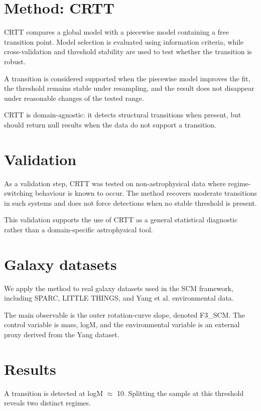 \documentclass[fleqn,usenatbib]{mnras}
\begin{document}
\section{Method: CRTT}

CRTT compares a global model with a piecewise model containing a free transition point. Model selection is evaluated using information criteria, while cross-validation and threshold stability are used to test whether the transition is robust.

A transition is considered supported when the piecewise model improves the fit, the threshold remains stable under resampling, and the result does not disappear under reasonable changes of the tested range.

CRTT is domain-agnostic: it detects structural transitions when present, but should return null results when the data do not support a transition.

\section{Validation}

As a validation step, CRTT was tested on non-astrophysical data where regime-switching behaviour is known to occur. The method recovers moderate transitions in such systems and does not force detections when no stable threshold is present.

This validation supports the use of CRTT as a general statistical diagnostic rather than a domain-specific astrophysical tool.

\section{Galaxy datasets}

We apply the method to real galaxy datasets used in the SCM framework, including SPARC, LITTLE THINGS, and Yang et al. environmental data.

The main observable is the outer rotation-curve slope, denoted F3\_SCM. The control variable is mass, logM, and the environmental variable is an external proxy derived from the Yang dataset.

\section{Results}

A transition is detected at logM $\approx$ 10. Splitting the sample at this threshold reveals two distinct regimes.
\end{document}

